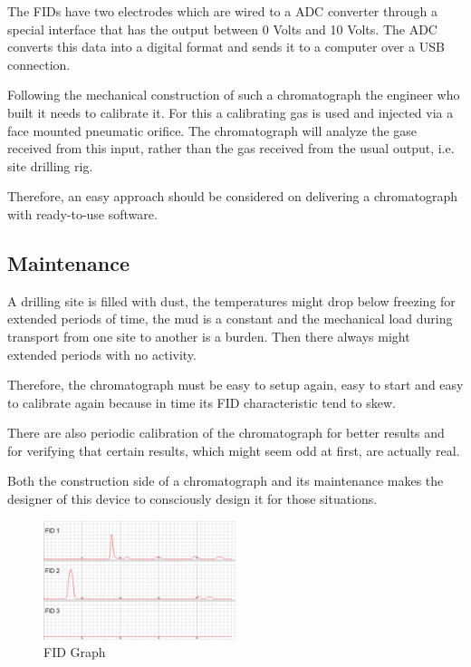 \documentclass[conference]{IEEEtran}
\begin{document}
    The FIDs have two electrodes which are wired to a ADC converter through a special interface that has the output between
    0 Volts and 10 Volts. The ADC converts this data into a digital format and sends it to a computer over a USB connection.

    Following the mechanical construction of such a chromatograph the engineer who built it needs to calibrate it. For this
    a calibrating gas is used and injected via a face mounted pneumatic orifice. The chromatograph will analyze the gase received
    from this input, rather than the gas received from the usual output, i.e. site drilling rig.
    
    Therefore, an easy approach should be considered on delivering a chromatograph with ready-to-use software.
    
\subsection{Maintenance}

    A drilling site is filled with dust, the temperatures might drop below freezing for extended periods of time, the mud is
    a constant and the mechanical load during transport from one site to another is a burden. Then there always might extended
    periods with no activity. 

    Therefore, the chromatograph must be easy to setup again, easy to start and easy to calibrate again because in time its 
    FID characteristic tend to skew.

    There are also periodic calibration of the chromatograph for better results and for verifying that certain results, which
    might seem odd at first, are actually real.

    Both the construction side of a chromatograph and its maintenance makes the designer of this device to consciously design
    it for those situations.

    \begin{figure}
        \centering
        \includegraphics[width=0.5\textwidth]{fidgraph.png}
        \caption{FID Graph}
        \label{fig:fidgraph}
    \end{figure}
\end{document}
